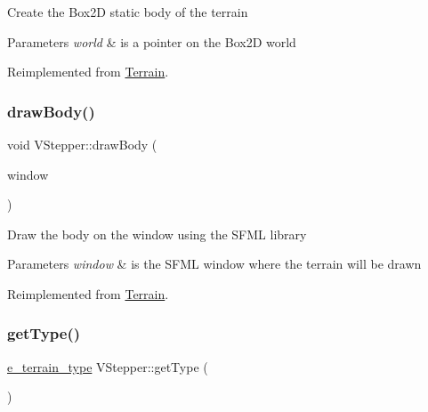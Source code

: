 Create the Box2D static body of the terrain 
\begin{DoxyParams}{Parameters}
{\em world} & is a pointer on the Box2D world \\
\hline
\end{DoxyParams}


Reimplemented from \mbox{\hyperlink{class_terrain_a97e007277f8abb9dde20ef2b49c38a3a}{Terrain}}.

\mbox{\label{class_v_stepper_ad81367e4f7422afcd460fd0094a25bc3}} 
\subsubsection{\texorpdfstring{draw\+Body()}{drawBody()}}
{\footnotesize\ttfamily void V\+Stepper\+::draw\+Body (\begin{DoxyParamCaption}\item[{sf\+::\+Render\+Window \&}]{window }\end{DoxyParamCaption})\hspace{0.3cm}{\ttfamily [virtual]}}

Draw the body on the window using the S\+F\+ML library 
\begin{DoxyParams}{Parameters}
{\em window} & is the S\+F\+ML window where the terrain will be drawn \\
\hline
\end{DoxyParams}


Reimplemented from \mbox{\hyperlink{class_terrain_ae60571b91c1979fa94bdfc5002da6ac7}{Terrain}}.

\mbox{\label{class_v_stepper_a9621c3cbd705479e32baf9671983cb8b}} 
\subsubsection{\texorpdfstring{get\+Type()}{getType()}}
{\footnotesize\ttfamily \mbox{\hyperlink{_terrain_8h_a6d0b7e83bb7325270c1162bece970fd8}{e\+\_\+terrain\+\_\+type}} V\+Stepper\+::get\+Type (\begin{DoxyParamCaption}{ }\end{DoxyParamCaption})\hspace{0.3cm}{\ttfamily [virtual]}}

